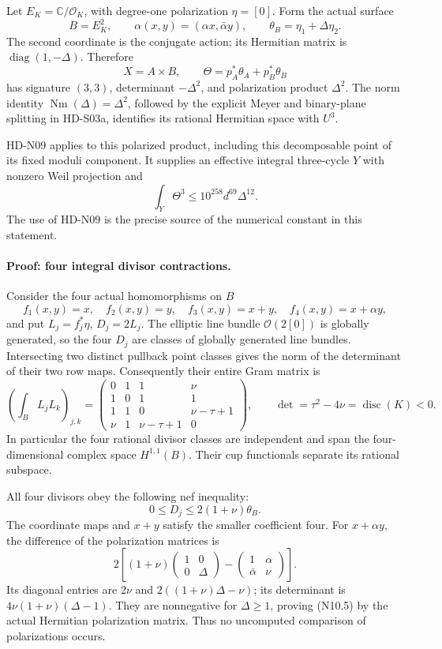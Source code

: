 Let $E_K=\mathbb C/\mathcal O_K$, with degree-one polarization
$\eta=[0]$. Form the actual surface
\[
 B=E_K^2,\qquad \alpha(x,y)=(\alpha x,\bar\alpha y),\qquad
 \theta_B=\eta_1+\Delta\eta_2.
\]
The second coordinate is the conjugate action; its Hermitian matrix
is $\operatorname{diag}(1,-\Delta)$. Therefore
\[
 X=A\times B,\qquad
 \Theta=p_A^*\theta_A+p_B^*\theta_B
\]
has signature $(3,3)$, determinant $-\Delta^2$, and polarization
product $\Delta^2$. The norm identity
$\operatorname{Nm}(\Delta)=\Delta^2$, followed by the explicit
Meyer and binary-plane splitting in HD-S03a, identifies its rational
Hermitian space with $U^3$.

HD-N09 applies to this polarized product, including this decomposable
point of its fixed moduli component. It supplies an effective integral
three-cycle $Y$ with nonzero Weil projection and
\[
 \int_Y\Theta^3\le 10^{258}d^{69}\Delta^{12}.               \tag{N10.3}
\]
The use of HD-N09 is the precise source of the numerical constant in
this statement.

\paragraph{Proof: four integral divisor contractions.}
Consider the four actual homomorphisms on $B$
\[
 f_1(x,y)=x,\quad f_2(x,y)=y,\quad f_3(x,y)=x+y,
 \quad f_4(x,y)=x+\alpha y,
\]
and put $L_j=f_j^*\eta$, $D_j=2L_j$. The elliptic line bundle
$\mathcal O(2[0])$ is globally generated, so the four $D_j$ are
classes of globally generated line bundles. Intersecting two distinct
pullback point classes gives the norm of the determinant of their two
row maps. Consequently their entire Gram matrix is
\[
 \left(\int_B L_jL_k\right)_{j,k}=
 \begin{pmatrix}
 0&1&1&\nu\\
 1&0&1&1\\
 1&1&0&\nu-\tau+1\\
 \nu&1&\nu-\tau+1&0
 \end{pmatrix},
 \qquad \det=\tau^2-4\nu=\operatorname{disc}(K)<0.          \tag{N10.4}
\]
In particular the four rational divisor classes are independent and
span the four-dimensional complex space $H^{1,1}(B)$. Their cup
functionals separate its rational subspace.

All four divisors obey the following nef inequality:
\[
 0\le D_j\le 2(1+\nu)\theta_B.                            \tag{N10.5}
\]
The coordinate maps and $x+y$ satisfy the smaller coefficient four.
For $x+\alpha y$, the difference of the polarization matrices is
\[
 2\left[(1+\nu)
    \begin{pmatrix}1&0\\0&\Delta\end{pmatrix}
  -\begin{pmatrix}1&\alpha\\\bar\alpha&\nu\end{pmatrix}\right].
\]
Its diagonal entries are $2\nu$ and
$2((1+\nu)\Delta-\nu)$; its determinant is
$4\nu(1+\nu)(\Delta-1)$. They are nonnegative for
$\Delta\ge1$, proving (N10.5) by the actual Hermitian polarization
matrix. Thus no uncomputed comparison of polarizations occurs.

